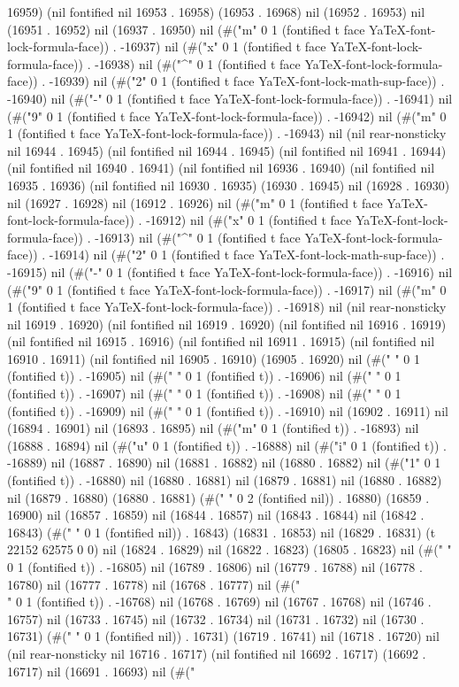 16959) (nil fontified nil 16953 . 16958) (16953 . 16968) nil (16952 . 16953) nil (16951 . 16952) nil (16937 . 16950) nil (#("m" 0 1 (fontified t face YaTeX-font-lock-formula-face)) . -16937) nil (#("x" 0 1 (fontified t face YaTeX-font-lock-formula-face)) . -16938) nil (#("^" 0 1 (fontified t face YaTeX-font-lock-formula-face)) . -16939) nil (#("2" 0 1 (fontified t face YaTeX-font-lock-math-sup-face)) . -16940) nil (#("-" 0 1 (fontified t face YaTeX-font-lock-formula-face)) . -16941) nil (#("9" 0 1 (fontified t face YaTeX-font-lock-formula-face)) . -16942) nil (#("m" 0 1 (fontified t face YaTeX-font-lock-formula-face)) . -16943) nil (nil rear-nonsticky nil 16944 . 16945) (nil fontified nil 16944 . 16945) (nil fontified nil 16941 . 16944) (nil fontified nil 16940 . 16941) (nil fontified nil 16936 . 16940) (nil fontified nil 16935 . 16936) (nil fontified nil 16930 . 16935) (16930 . 16945) nil (16928 . 16930) nil (16927 . 16928) nil (16912 . 16926) nil (#("m" 0 1 (fontified t face YaTeX-font-lock-formula-face)) . -16912) nil (#("x" 0 1 (fontified t face YaTeX-font-lock-formula-face)) . -16913) nil (#("^" 0 1 (fontified t face YaTeX-font-lock-formula-face)) . -16914) nil (#("2" 0 1 (fontified t face YaTeX-font-lock-math-sup-face)) . -16915) nil (#("-" 0 1 (fontified t face YaTeX-font-lock-formula-face)) . -16916) nil (#("9" 0 1 (fontified t face YaTeX-font-lock-formula-face)) . -16917) nil (#("m" 0 1 (fontified t face YaTeX-font-lock-formula-face)) . -16918) nil (nil rear-nonsticky nil 16919 . 16920) (nil fontified nil 16919 . 16920) (nil fontified nil 16916 . 16919) (nil fontified nil 16915 . 16916) (nil fontified nil 16911 . 16915) (nil fontified nil 16910 . 16911) (nil fontified nil 16905 . 16910) (16905 . 16920) nil (#(" " 0 1 (fontified t)) . -16905) nil (#(" " 0 1 (fontified t)) . -16906) nil (#(" " 0 1 (fontified t)) . -16907) nil (#(" " 0 1 (fontified t)) . -16908) nil (#(" " 0 1 (fontified t)) . -16909) nil (#(" " 0 1 (fontified t)) . -16910) nil (16902 . 16911) nil (16894 . 16901) nil (16893 . 16895) nil (#("m" 0 1 (fontified t)) . -16893) nil (16888 . 16894) nil (#("u" 0 1 (fontified t)) . -16888) nil (#("i" 0 1 (fontified t)) . -16889) nil (16887 . 16890) nil (16881 . 16882) nil (16880 . 16882) nil (#("1" 0 1 (fontified t)) . -16880) nil (16880 . 16881) nil (16879 . 16881) nil (16880 . 16882) nil (16879 . 16880) (16880 . 16881) (#("  " 0 2 (fontified nil)) . 16880) (16859 . 16900) nil (16857 . 16859) nil (16844 . 16857) nil (16843 . 16844) nil (16842 . 16843) (#(" " 0 1 (fontified nil)) . 16843) (16831 . 16853) nil (16829 . 16831) (t 22152 62575 0 0) nil (16824 . 16829) nil (16822 . 16823) (16805 . 16823) nil (#(" " 0 1 (fontified t)) . -16805) nil (16789 . 16806) nil (16779 . 16788) nil (16778 . 16780) nil (16777 . 16778) nil (16768 . 16777) nil (#("\\" 0 1 (fontified t)) . -16768) nil (16768 . 16769) nil (16767 . 16768) nil (16746 . 16757) nil (16733 . 16745) nil (16732 . 16734) nil (16731 . 16732) nil (16730 . 16731) (#(" " 0 1 (fontified nil)) . 16731) (16719 . 16741) nil (16718 . 16720) nil (nil rear-nonsticky nil 16716 . 16717) (nil fontified nil 16692 . 16717) (16692 . 16717) nil (16691 . 16693) nil (#("
